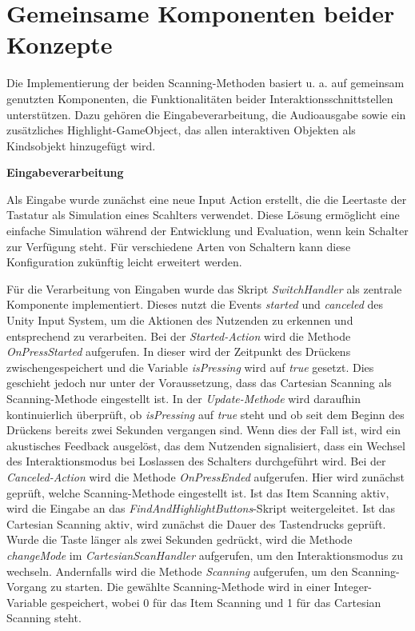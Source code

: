\section {Gemeinsame Komponenten beider Konzepte}

Die Implementierung der beiden Scanning-Methoden basiert u. a. auf gemeinsam genutzten Komponenten, die Funktionalitäten beider Interaktionsschnittstellen unterstützen. Dazu gehören die Eingabeverarbeitung, die Audioausgabe sowie ein zusätzliches Highlight-GameObject, das allen interaktiven Objekten als Kindsobjekt hinzugefügt wird. 

{\normalfont \bfseries Eingabeverarbeitung}

Als Eingabe wurde zunächst eine neue Input Action erstellt, die die Leertaste der Tastatur als Simulation eines Scahlters verwendet. Diese Lösung ermöglicht eine einfache Simulation während der Entwicklung und Evaluation, wenn kein Schalter zur Verfügung steht. Für verschiedene Arten von Schaltern kann diese Konfiguration zukünftig leicht erweitert werden.

Für die Verarbeitung von Eingaben wurde das Skript \textit{SwitchHandler} als zentrale Komponente implementiert. Dieses nutzt die Events \textit{started} und \textit{canceled} des Unity Input System, um die Aktionen des Nutzenden zu erkennen und entsprechend zu verarbeiten. Bei der \textit{Started-Action} wird die Methode \textit{OnPressStarted} aufgerufen. In dieser wird der Zeitpunkt des Drückens zwischengespeichert und die Variable \textit{isPressing} wird auf \textit{true} gesetzt. Dies geschieht jedoch nur unter der Voraussetzung, dass das Cartesian Scanning als Scanning-Methode eingestellt ist. In der \textit{Update-Methode} wird daraufhin kontinuierlich überprüft, ob \textit{isPressing} auf \textit{true} steht und ob seit dem Beginn des Drückens bereits zwei Sekunden vergangen sind. Wenn dies der Fall ist, wird ein akustisches Feedback ausgelöst, das dem Nutzenden signalisiert, dass ein Wechsel des Interaktionsmodus bei Loslassen des Schalters durchgeführt wird.
Bei der \textit{Canceled-Action} wird die Methode \textit{OnPressEnded} aufgerufen. Hier wird zunächst geprüft, welche Scanning-Methode eingestellt ist. Ist das Item Scanning aktiv, wird die Eingabe an das \textit{FindAndHighlightButtons}-Skript weitergeleitet. Ist das Cartesian Scanning aktiv, wird zunächst die Dauer des Tastendrucks geprüft. Wurde die Taste länger als zwei Sekunden gedrückt, wird die Methode \textit{changeMode} im \textit{CartesianScanHandler} aufgerufen, um den Interaktionsmodus zu wechseln. Andernfalls wird die Methode \textit{Scanning} aufgerufen, um den Scanning-Vorgang zu starten. Die gewählte Scanning-Methode wird in einer Integer-Variable gespeichert, wobei 0 für das Item Scanning und 1 für das Cartesian Scanning steht. 

